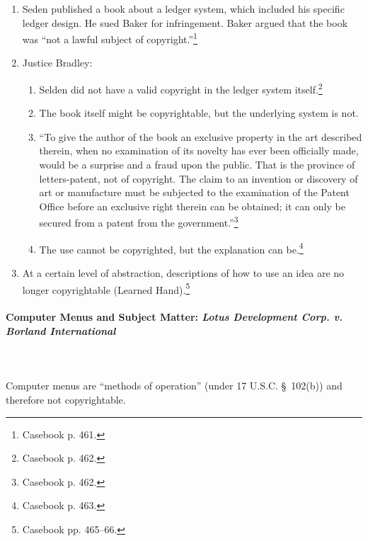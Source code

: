 \begin{enumerate}
    \item Seden published a book about a ledger system, which included his 
    specific ledger design. He sued Baker for infringement. Baker argued that 
    the book was ``not a lawful subject of copyright.''\footnote{Casebook p. 
    461.}
    \item Justice Bradley:
    \begin{enumerate}
        \item Selden did not have a valid copyright in the ledger system 
        itself.\footnote{Casebook p. 462.}
        \item The book itself might be copyrightable, but the underlying 
        system is not.
        \item ``To give the author of the book an exclusive property in the 
        art described therein, when no examination of its novelty has ever 
        been officially made, would be a surprise and a fraud upon the public. 
        That is the province of letters-patent, not of copyright. The claim to 
        an invention or discovery of art or manufacture must be subjected to 
        the examination of the Patent Office before an exclusive right therein 
        can be obtained; it can only be secured from a patent from the 
        government.''\footnote{Casebook p. 462.}
        \item The use cannot be copyrighted, but the explanation can 
        be.\footnote{Casebook p. 463.}
    \end{enumerate}
    \item At a certain level of abstraction, descriptions of how to use an 
    idea are no longer copyrightable (Learned Hand).\footnote{Casebook pp. 
    465--66.}
\end{enumerate}

\newpage %

\paragraph{Computer Menus and Subject Matter: \emph{Lotus Development Corp. v. 
Borland International}}
~\\\\
Computer menus are ``methods of operation'' (under 17 U.S.C. \S\ 102(b)) and 
therefore not copyrightable.

